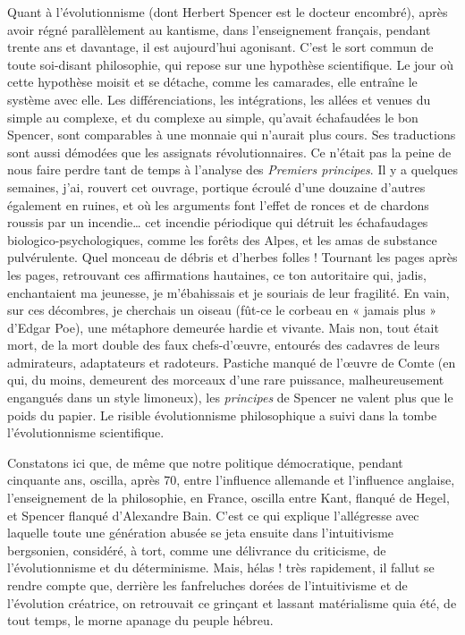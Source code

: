 \documentclass[french,twoside]{book} %
\begin{document}
Quant à l’évolutionnisme (dont Herbert Spencer est le docteur encombré), après avoir régné parallèlement au kantisme, dans l’enseignement français, pendant trente ans et davantage, il est aujourd’hui agonisant. C’est le sort commun de toute soi-disant philosophie, qui repose sur une hypothèse scientifique. Le jour où cette hypothèse moisit et se détache, comme les camarades, elle entraîne le système avec elle. Les différenciations, les intégrations, les allées et venues du simple au complexe, et du complexe au simple, qu’avait échafaudées le bon Spencer, sont comparables à une monnaie qui n’aurait plus cours. Ses traductions sont aussi démodées que les assignats révolutionnaires. Ce n’était pas la peine de nous faire perdre tant de temps à l’analyse des {\itshape Premiers principes}. Il y a quelques semaines, j’ai, rouvert cet ouvrage, portique écroulé d’une douzaine d’autres également en ruines, et où les arguments font l’effet de ronces et de chardons roussis par un incendie… cet incendie périodique qui détruit les échafaudages biologico-psychologiques, comme les forêts des Alpes, et les amas de substance pulvérulente. Quel monceau de débris et d’herbes folles ! Tournant les pages après les pages, retrouvant ces affirmations hautaines, ce ton autoritaire qui, jadis, enchantaient ma jeunesse, je m’ébahissais et je souriais de leur fragilité. En vain, sur ces décombres, je cherchais un oiseau (fût-ce le corbeau en « jamais plus » d’Edgar Poe), une métaphore demeurée hardie et vivante. Mais non, tout était mort, de la mort double des faux chefs-d’œuvre, entourés des cadavres de leurs admirateurs, adaptateurs et radoteurs. Pastiche manqué de l’œuvre de Comte (en qui, du moins, demeurent des morceaux d’une rare puissance, malheureusement engangués dans un style limoneux), les {\itshape principes} de Spencer ne valent plus que le poids du papier. Le risible évolutionnisme philosophique a suivi dans la tombe l’évolutionnisme scientifique.\par
Constatons ici que, de même que notre politique démocratique, pendant cinquante ans, oscilla, après 70, entre l’influence allemande et l’influence anglaise, l’enseignement de la philosophie, en France, oscilla entre Kant, flanqué de Hegel, et Spencer flanqué d’Alexandre Bain. C’est ce qui explique l’allégresse avec laquelle toute une génération abusée se jeta ensuite dans l’intuitivisme bergsonien, considéré, à tort, comme une délivrance du criticisme, de l’évolutionnisme et du déterminisme. Mais, hélas ! très rapidement, il fallut se rendre compte que, derrière les fanfreluches dorées de l’intuitivisme et de l’évolution créatrice, on retrouvait ce grinçant et lassant matérialisme quia été, de tout temps, le morne apanage du peuple hébreu.\par
\end{document}
